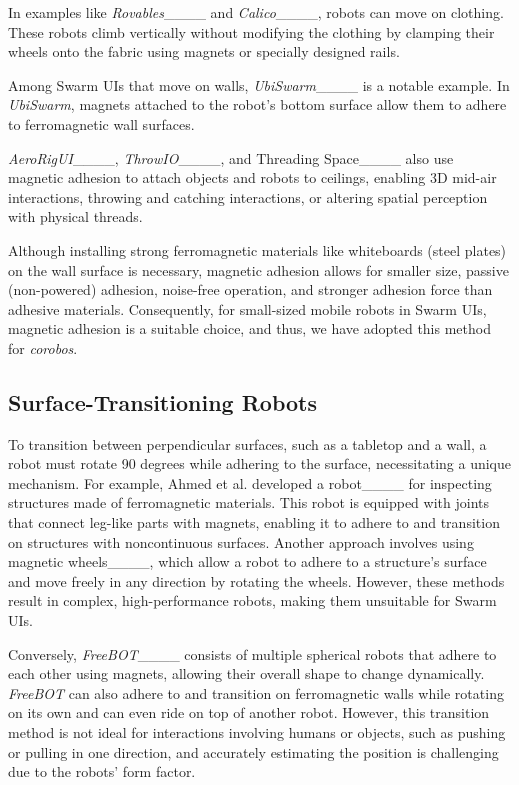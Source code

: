 In examples like \textit{Rovables}____ and \textit{Calico}____, robots can move on clothing.
These robots climb vertically without modifying the clothing by clamping their wheels onto the fabric using magnets or specially designed rails.

Among Swarm UIs that move on walls, \textit{UbiSwarm}____ is a notable example.
In \textit{UbiSwarm}, magnets attached to the robot’s bottom surface allow them to adhere to ferromagnetic wall surfaces.

\textit{AeroRigUI}____, \textit{ThrowIO}____, and Threading Space____ also use magnetic adhesion to attach objects and robots to ceilings, enabling 3D mid-air interactions, throwing and catching interactions, or altering spatial perception with physical threads.

Although installing strong ferromagnetic materials like whiteboards (steel plates) on the wall surface is necessary, magnetic adhesion allows for smaller size, passive (non-powered) adhesion, noise-free operation, and stronger adhesion force than adhesive materials.
Consequently, for small-sized mobile robots in Swarm UIs, magnetic adhesion is a suitable choice, and thus, we have adopted this method for \textit{corobos}.


\subsection{Surface-Transitioning Robots}
To transition between perpendicular surfaces, such as a tabletop and a wall, a robot must rotate 90 degrees while adhering to the surface, necessitating a unique mechanism.
For example, Ahmed et al. developed a robot____ for inspecting structures made of ferromagnetic materials.
This robot is equipped with joints that connect leg-like parts with magnets, enabling it to adhere to and transition on structures with noncontinuous surfaces.
Another approach involves using magnetic wheels____, which allow a robot to adhere to a structure’s surface and move freely in any direction by rotating the wheels.
However, these methods result in complex, high-performance robots, making them unsuitable for Swarm UIs.

Conversely, \textit{FreeBOT}____ consists of multiple spherical robots that adhere to each other using magnets, allowing their overall shape to change dynamically.
\textit{FreeBOT} can also adhere to and transition on ferromagnetic walls while rotating on its own and can even ride on top of another robot.
However, this transition method is not ideal for interactions involving humans or objects, such as pushing or pulling in one direction, and accurately estimating the position is challenging due to the robots’ form factor.

